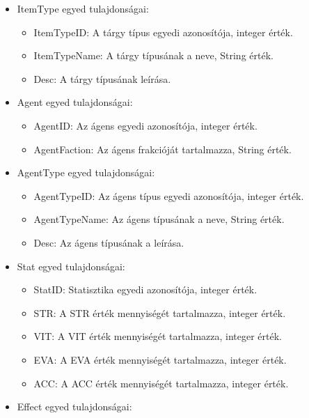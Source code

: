 \begin{itemize}
    \item ItemType egyed tulajdonságai:
    
    \begin{itemize}
        \item ItemTypeID: A tárgy típus egyedi azonosítója, integer érték.
        \item ItemTypeName: A tárgy típusának a neve, String érték.
        \item Desc: A tárgy típusának leírása.
    \end{itemize}

    \item Agent egyed tulajdonságai:
    
    \begin{itemize}
        \item AgentID: Az ágens egyedi azonosítója, integer érték.
        \item AgentFaction: Az ágens frakcióját tartalmazza, String érték.
    \end{itemize}

    \item AgentType egyed tulajdonságai:

    \begin{itemize}
        \item AgentTypeID: Az ágens típus egyedi azonosítója, integer érték.
        \item AgentTypeName: Az ágens típusának a neve, String érték.
        \item Desc: Az ágens típusának a leírása.
    \end{itemize}

    \item Stat egyed tulajdonságai:

    \begin{itemize}
        \item StatID: Statisztika egyedi azonosítója, integer érték.
        \item STR: A STR érték mennyiségét tartalmazza, integer érték.
        \item VIT: A VIT érték mennyiségét tartalmazza, integer érték.
        \item EVA: A EVA érték mennyiségét tartalmazza, integer érték.
        \item ACC: A ACC érték mennyiségét tartalmazza, integer érték.
    \end{itemize}

    \item Effect egyed tulajdonságai:


\end{itemize}
